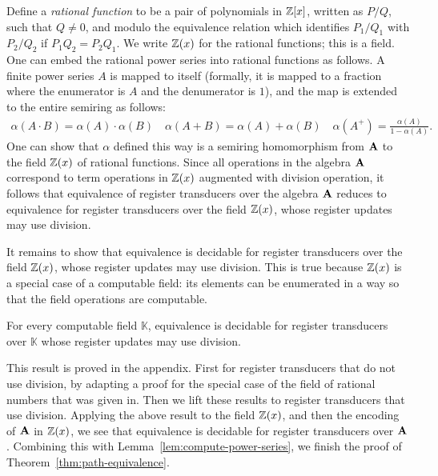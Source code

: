 Define a \emph{rational function} to be a pair of polynomials in $\mathbb Z[x]$, written as $P/Q$, such that $Q \neq 0$, and modulo the equivalence relation which identifies $P_1/Q_1$ with $P_2/Q_2$ if $P_1Q_2 = P_2Q_1$. We write $\mathbb Z(x)$ for the rational functions; this is a field. One can embed the rational power series into rational functions as follows. A finite power series $A$ is mapped to itself (formally, it is mapped to a fraction where the enumerator is $A$ and the denumerator is $1$), and the map is extended to the entire semiring as follows:
\begin{align*}
\alpha(A \cdot B) = \alpha(A) \cdot \alpha(B) \quad \alpha(A + B) = \alpha(A) + \alpha(B) \quad \alpha(A^+) = \frac{\alpha(A)}{1-\alpha(A)}.
\end{align*}
One can show that $\alpha$ defined this way is a semiring homomorphism from  $\mathbf{A}$ to the field $\mathbb Z(x)$ of rational functions. Since all operations in the algebra $\mathbf{A}$ correspond to term operations in $\mathbb Z(x)$ augmented with division operation, it follows that equivalence of register transducers over the algebra $\mathbf{A}$ reduces to equivalence for register transducers over the field $\mathbb Z(x)$, whose register updates may use division.

It remains to show that equivalence is decidable for register transducers over the field $\mathbb Z(x)$, whose register updates may use division. This is true because $\mathbb Z(x)$ is a special case of a computable field: its elements can be enumerated in a way so that the field operations are computable.
\begin{theorem}\label{thm:equivalence-for-computable-field}
    For every computable field $\mathbb K$, 
    equivalence is decidable for register transducers over $\mathbb K$ whose register updates may use division. 
\end{theorem}
This result is proved in the appendix. First for register transducers that do not use division, by adapting a proof for the special case of the field of rational numbers that was given in\cite[Theorem 6.6]{seidlManethKemper2018}. Then we lift these results to register transducers that use division. Applying the above result to the field $\mathbb Z(x)$, and then the encoding of $\mathbf{A}$ in $\mathbb Z(x)$, we see that equivalence is decidable for register transducers over $\mathbf{A}$. Combining this with Lemma~\ref{lem:compute-power-series}, we finish the proof of Theorem~\ref{thm:path-equivalence}.



